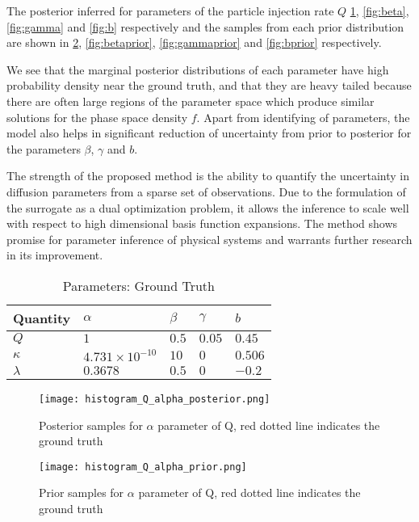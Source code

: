 The posterior inferred for parameters of the particle injection rate $Q$ \ref{fig:alpha}, 
\ref{fig:beta}, \ref{fig:gamma} and \ref{fig:b} respectively and the samples from each prior distribution are shown in \ref{fig:alphaprior}, \ref{fig:betaprior}, \ref{fig:gammaprior} and \ref{fig:bprior} respectively.

We see that the marginal posterior distributions of each parameter have high probability 
density near the ground truth, and that they are heavy tailed because there are often large 
regions of the parameter space which produce similar solutions for the phase space density $f$. 
Apart from identifying of parameters, the model also helps in significant reduction of uncertainty
from prior to posterior for the parameters $\beta$, $\gamma$ and $b$.

The strength of the proposed method is the ability to quantify the uncertainty in diffusion parameters from a sparse set of observations. Due to the formulation of the surrogate as a dual optimization problem, it allows the inference to scale well with respect to high dimensional basis function expansions. The method shows promise for parameter inference of physical systems and warrants further research in its improvement.


\begin{table}[t]
  \caption{Parameters: Ground Truth}
  \label{tab:ground-truth}
  \centering
  \begin{tabular}{lllll}
    \toprule
    \cmidrule{1-2}
    Quantity     & $\alpha$     & $\beta$ & $\gamma$ & $b$ \\
    \midrule
    $Q$ & $1$  & $0.5$ & $0.05$  & $0.45$     \\
    $\kappa$  & $4.731 \times 10^{-10}$ & $10$  & $0$ & $0.506$ \\
    $\lambda$ & $0.3678$ & $0.5$  & $0$ & $-0.2$ \\
    \bottomrule
  \end{tabular}
\end{table}

\begin{figure}[h]
\vspace{.3in}
\centerline{\texttt{[image: histogram\_Q\_alpha\_posterior.png]}}
\vspace{.3in}
\caption{Posterior samples for $\alpha$ parameter of Q, red dotted line indicates the ground truth}
\label{fig:alpha}
\end{figure}

\begin{figure}[h]
\vspace{.3in}
\centerline{\texttt{[image: histogram\_Q\_alpha\_prior.png]}}
\vspace{.3in}
\caption{Prior samples for $\alpha$ parameter of Q, red dotted line indicates the ground truth}
\label{fig:alphaprior}
\end{figure}


